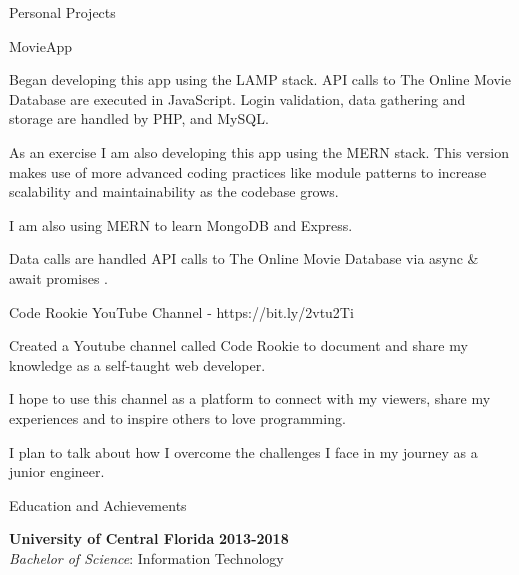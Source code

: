 \documentclass{resume} %
\begin{document}
\begin{rSection}{Personal Projects}

\begin{rSubsection}{MovieApp}{\bf }{}{}

\item Began developing this app using the LAMP stack. API calls to The Online Movie Database are executed in JavaScript. Login validation, data gathering and storage are handled by PHP, and MySQL.
\item As an exercise I am also developing this app using the MERN stack. This version makes use of more advanced coding practices like module patterns to increase scalability and maintainability as the codebase grows.
\item I am also using MERN to learn MongoDB and Express.
\item Data calls are handled API calls to The Online Movie Database via async \& await promises .


\end{rSubsection}

\begin{rSubsection}{Code Rookie YouTube Channel - https://bit.ly/2vtu2Ti}{\bf }{}{}

\item Created a Youtube channel called Code Rookie to document and share my knowledge as a self-taught web developer. 
\item I hope to use this channel as a platform to connect with my viewers, share my experiences and to inspire others to love programming.
\item I plan to talk about how I overcome the challenges I face in my journey as a junior engineer.


\end{rSubsection}
\end{rSection}



\begin{rSection}{Education and Achievements}

{\bf University of Central Florida} \hfill {\bf 2013-2018} \\ 
{\it Bachelor of Science}: Information Technology \\
\end{rSection}
\end{document}
